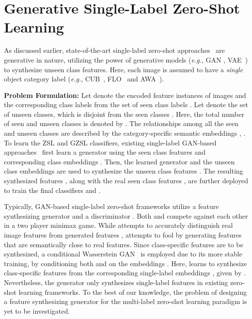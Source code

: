 \documentclass[10pt,journal,compsoc]{IEEEtran}
\begin{document}
\section{\hspace{-0.3em}Generative Single-Label Zero-Shot Learning\label{sec:slzsl}}
As discussed earlier, state-of-the-art single-label zero-shot approaches~\cite{xian2018feature,Rafael18eccv,li19leveraging,huang19generative,Mandal19cvpr,xian2019f} are generative in nature, utilizing the power of generative models (\textit{e.g.}, GAN \cite{gan}, VAE~\cite{kingma13iclr}) to synthesize unseen class features. 
Here, each image is assumed to have a \textit{single} object category label (\textit{e.g.}, CUB~\cite{cub}, FLO~\cite{flo} and AWA~\cite{zsl-good-bad-ugly}).




\noindent\textbf{Problem Formulation:}
Let  denote the encoded feature instances of images and  the corresponding class labels from the set of  seen class labels . Let  denote the set of  unseen classes, which is disjoint from the seen classes . Here, the total number of seen and unseen classes is denoted by . The relationships among all the seen and unseen classes are described by the category-specific semantic embeddings , . 
To learn the ZSL and GZSL classifiers, existing single-label GAN-based approaches~\cite{xian2018feature,li19leveraging,huang19generative,xian2019f} first learn a generator using the seen class features  and corresponding class embeddings . Then, the learned generator and the unseen class embeddings  are used to synthesize the unseen class features . 
The resulting synthesized features , along with the real seen class features , are further deployed to train the final classifiers  and . 



Typically, GAN-based single-label zero-shot frameworks utilize a feature synthesizing generator  and a discriminator . Both  and  compete against each other in a two player minimax game. While  attempts to accurately distinguish real image features  from generated features ,  attempts to fool  by generating features that are semantically close to real features. Since class-specific features are to be synthesized, a conditional Wasserstein GAN~\cite{wgan} is employed due to its more stable training, by conditioning both  and  on the embeddings . Here,  learns to synthesize class-specific features  from the corresponding single-label embeddings , given by . Nevertheless, the generator only synthesizes single-label features in existing zero-shot learning frameworks. To the best of our knowledge, the problem of designing a feature synthesizing generator for the multi-label zero-shot learning paradigm is yet to be investigated.
\end{document}
